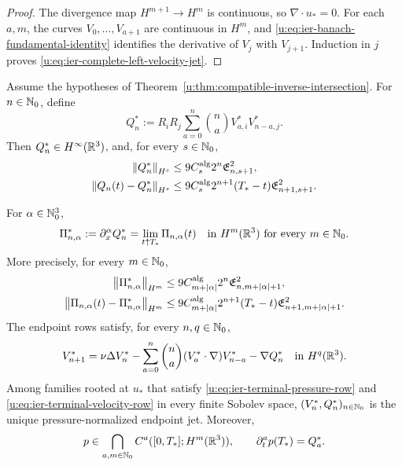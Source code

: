 \begin{proof}
The divergence map \(H^{m+1}\to H^m\) is continuous, so
\(\nabla\cdot u_*=0\).  For each \(a,m\), the curves
\(V_0,\ldots,V_{a+1}\) are continuous in \(H^m\), and
\eqref{u:eq:ier-banach-fundamental-identity} identifies the derivative of
\(V_j\) with \(V_{j+1}\).  Induction in \(j\) proves
\eqref{u:eq:ier-complete-left-velocity-jet}.
\end{proof}

\begin{theorem}
\label{u:thm:ier-pressure-complete-endpoint}
\begin{samepage}
Assume the hypotheses of
Theorem~\ref{u:thm:compatible-inverse-intersection}.
For \(n\in\mathbb N_0\), define
\begin{equation}
 Q_n^*:=R_iR_j\sum_{a=0}^{n}\binom na
 V_{a,i}^*V_{n-a,j}^*.
 \label{u:eq:ier-terminal-pressure-row}
\end{equation}
Then \(Q_n^*\in H^\infty(\mathbb R^3)\), and, for every \(s\in\mathbb N_0\),
\begin{align}
 \left\lVert Q_n^*\right\rVert_{H^s}
 &\le9C_s^{\rm alg}2^n\mathfrak E_{n,s+1}^2,
 \label{u:eq:ier-terminal-pressure-size}\\
 \left\lVert Q_n(t)-Q_n^*\right\rVert_{H^s}
 &\le9C_s^{\rm alg}2^{n+1}(T_*-t)\mathfrak E_{n+1,s+1}^2.
 \label{u:eq:ier-terminal-pressure-modulus}
\end{align}
\end{samepage}
For \(\alpha\in\mathbb N_0^3\),
\begin{equation}
 \Pi_{n,\alpha}^*:=\partial_x^\alpha Q_n^*
 =\lim_{t\uparrow T_*}\Pi_{n,\alpha}(t)
 \quad\text{in }H^m(\mathbb R^3)\text{ for every }m\in\mathbb N_0.
 \label{u:eq:ier-terminal-mixed-pressure-row}
\end{equation}
More precisely, for every \(m\in\mathbb N_0\),
\begin{align}
 \left\lVert \Pi_{n,\alpha}^*\right\rVert_{H^m}
 &\le9C_{m+|\alpha|}^{\rm alg}2^n
 \mathfrak E_{n,m+|\alpha|+1}^2,
 \label{u:eq:ier-terminal-mixed-pressure-size}\\
 \left\lVert \Pi_{n,\alpha}(t)-\Pi_{n,\alpha}^*\right\rVert_{H^m}
 &\le9C_{m+|\alpha|}^{\rm alg}2^{n+1}(T_*-t)
 \mathfrak E_{n+1,m+|\alpha|+1}^2.
 \label{u:eq:ier-terminal-mixed-pressure-modulus}
\end{align}
The endpoint rows satisfy, for every \(n,q\in\mathbb N_0\),
\begin{equation}
 V_{n+1}^*
 =\nu\Delta V_n^*
 -\sum_{a=0}^{n}\binom na(V_a^*\cdot\nabla)V_{n-a}^*
 -\nabla Q_n^*
 \quad\text{in }H^q(\mathbb R^3).
 \label{u:eq:ier-terminal-velocity-row}
\end{equation}
Among families rooted at \(u_*\) that satisfy
\eqref{u:eq:ier-terminal-pressure-row} and
\eqref{u:eq:ier-terminal-velocity-row} in every finite Sobolev space,
\((V_n^*,Q_n^*)_{n\in\mathbb N_0}\) is the unique pressure-normalized endpoint
jet.  Moreover,
\begin{equation}
 p\in\bigcap_{a,m\in\mathbb N_0}C^a([0,T_*];H^m(\mathbb R^3)),
 \qquad
 \partial_t^ap(T_*)=Q_a^*.
 \label{u:eq:ier-complete-left-pressure-jet}
\end{equation}
\end{theorem}


